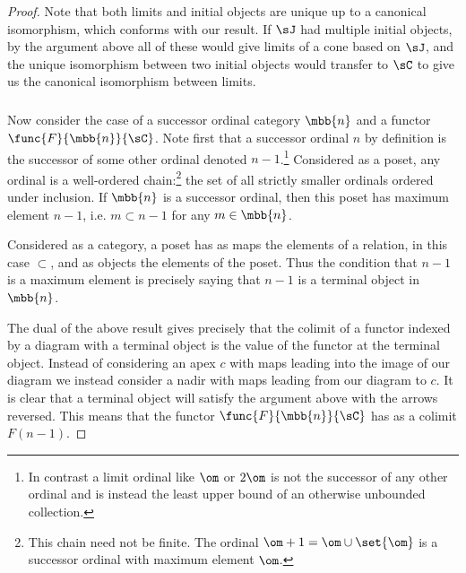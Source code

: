 \documentclass[../../main]{subfiles}
\begin{document}
\begin{proof}
	Note that both limits and initial objects are unique up to a canonical
	isomorphism, which conforms with our result. If \(\sJ\) had multiple initial
	objects, by the argument above all of these would give limits of a cone
	based on \(\sJ\), and the unique isomorphism between two initial objects
	would transfer to \(\sC\) to give us the canonical isomorphism between
	limits.

	\subparagraph{}
	Now consider the case of a successor ordinal category \(\mbb{n}\) and a
	functor \(\func{F}{\mbb{n}}{\sC}\). Note first that a successor ordinal
	\(n\) by definition is the successor of some other ordinal denoted
	\(n-1\).\footnote{In contrast a limit ordinal
		like \(\om\) or \(2\om\) is not the successor of any other ordinal and
	is instead the least upper bound of an otherwise unbounded collection.}
	Considered as a poset, any ordinal is a well-ordered chain:\footnote{This
		chain need not be finite. The ordinal \(\om+1=\om\cup\set{\om}\) is a
	successor ordinal with maximum element \(\om\).} the set of all strictly
	smaller ordinals ordered under inclusion. If \(\mbb{n}\) is a successor
	ordinal, then this poset has maximum element \(n-1\), i.e. \(m\subset n-1\)
	for any \(m\in\mbb{n}\).

	Considered as a category, a poset has as maps the elements of a relation, in
	this case \(\subset\), and as objects the elements of the poset. Thus the
	condition that \(n-1\) is a maximum element is precisely saying that \(n-1\)
	is a terminal object in \(\mbb{n}\).

	The dual of the above result gives precisely that the colimit of a functor
	indexed by a diagram with a terminal object is the value of the functor at
	the terminal object. Instead of considering an apex \(c\) with maps leading
	into the image of our diagram we instead consider a nadir with maps leading
	from our diagram to \(c\). It is clear that a terminal object will satisfy
	the argument above with the arrows reversed. This means that the functor
	\(\func{F}{\mbb{n}}{\sC}\) has as a colimit \(F(n-1)\).
\end{proof}
\end{document}
